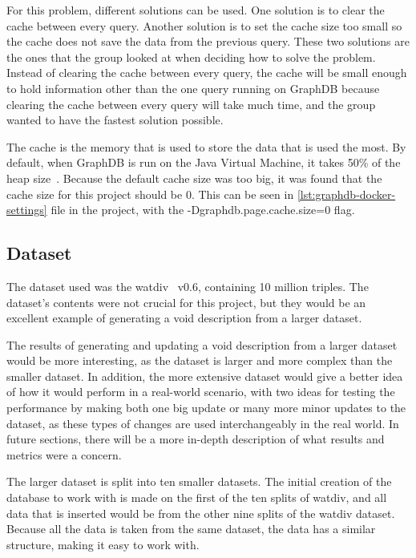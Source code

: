 For this problem, different solutions can be used. One solution is to clear the cache between every query. Another solution is to set the cache size too small so the cache does not save the data from the previous query. These two solutions are the ones that the group looked at when deciding how to solve the problem. Instead of clearing the cache between every query, the cache will be small enough to hold information other than the one query running on GraphDB because clearing the cache between every query will take much time, and the group wanted to have the fastest solution possible.

The cache is the memory that is used to store the data that is used the most. By default, when GraphDB is run on the Java Virtual Machine, it takes 50\% of the heap size~\cite{cache-strategy}.
Because the default cache size was too big, it was found that the cache size for this project should be 0. This can be seen in \autoref{lst:graphdb-docker-settings} file in the project, with the -Dgraphdb.page.cache.size=0 flag.


\subsection{Dataset}\label{sec:dataset}
The dataset used was the \gls{watdiv}~\cite{WatDiv} v0.6, containing 10 million triples. The dataset's contents were not crucial for this project, but they would be an excellent example of generating a \gls{void} description from a larger dataset.

The results of generating and updating a \gls{void} description from a larger dataset would be more interesting, as the dataset is larger and more complex than the smaller dataset. In addition, the more extensive dataset would give a better idea of how it would perform in a real-world scenario, with two ideas for testing the performance by making both one big update or many more minor updates to the dataset, as these types of changes are used interchangeably in the real world. In future sections, there will be a more in-depth description of what results and metrics were a concern.

The larger dataset is split into ten smaller datasets. The initial creation of the database to work with is made on the first of the ten splits of \gls{watdiv}, and all data that is inserted would be from the other nine splits of the \gls{watdiv} dataset. Because all the data is taken from the same dataset, the data has a similar structure, making it easy to work with.

